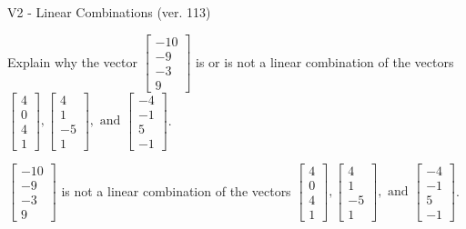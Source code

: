 \begin{exercise}
  \begin{exerciseTitle}V2 - Linear Combinations (ver. 113)\end{exerciseTitle}
  \begin{exerciseStatement}
    Explain why the vector \(\left[\begin{array}{c}
-10 \\
-9 \\
-3 \\
9
\end{array}\right]\)  is or is not a linear 
	combination of the vectors \(\left[\begin{array}{c}
4 \\
0 \\
4 \\
1
\end{array}\right] , \left[\begin{array}{c}
4 \\
1 \\
-5 \\
1
\end{array}\right] , \text{ and } \left[\begin{array}{c}
-4 \\
-1 \\
5 \\
-1
\end{array}\right]\).
	


  \end{exerciseStatement}
  \begin{exerciseAnswer}
   \(\left[\begin{array}{c}
-10 \\
-9 \\
-3 \\
9
\end{array}\right]\) 
  	 is not  
	a linear combination of the vectors \(\left[\begin{array}{c}
4 \\
0 \\
4 \\
1
\end{array}\right] , \left[\begin{array}{c}
4 \\
1 \\
-5 \\
1
\end{array}\right] , \text{ and } \left[\begin{array}{c}
-4 \\
-1 \\
5 \\
-1
\end{array}\right]\).

	
  


  \end{exerciseAnswer}
\end{exercise}
